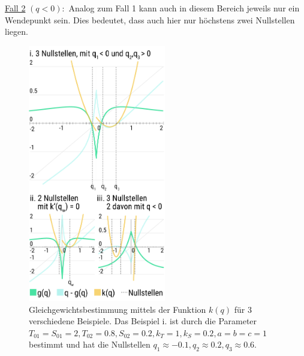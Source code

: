 \documentclass[a4paper,twoside]{article}
\begin{document}
	\noindent\underline{Fall 2} \((q < 0):\) Analog zum Fall 1 kann auch in diesem Bereich jeweils nur ein Wendepunkt sein. Dies bedeutet, dass auch hier nur höchstens zwei Nullstellen liegen.
	
	\begin{figure}[!h]
  		\centering
 		\includegraphics[width=6cm]{Grafiken/q_von_q_falluntersuchung_anderes_layout.png}
  		\caption{Gleichgewichtsbestimmung mittels der Funktion \(k(q)\) für 3 verschiedene Beispiele. Das Beispiel i. ist durch die Parameter \(T_{01} = S_{01} = 2, T_{02} = 0.8, S_{02} = 0.2, k_T = 1, k_S = 0.2, a = b = c = 1 \) bestimmt und hat die Nullstellen \(q_1 \approx -0.1, q_2 \approx 0.2, q_3 \approx 0.6\). }
  		\label{fig:q_von_q_falluntersuchung}
	\end{figure}	
	
\end{document}

